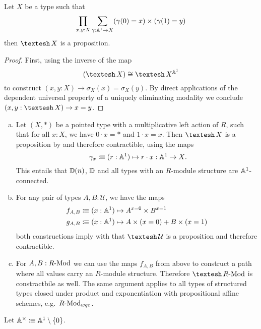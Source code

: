 \begin{lemma}
  \label{A1-paths-to-A1-prop}
  Let $X$ be a type such that
  \[
  \prod_{x,y:X} \sum_{\gamma:\mathbb{A}^1\to X} (\gamma(0)=x)\times (\gamma(1)=y)
  \]
  then $\shape X$ is a proposition.
\end{lemma}

\begin{proof}
  First, using the inverse of the map
  \[
    (\shape X) \cong  \shape X^{\A^1}
  \]
  to construct $(x,y:X)\to \sigma_X(x)=\sigma_X(y)$.
  By direct applications of the dependent universal property of a uniquely eliminating modality we conclude
  $(x,y:\shape X)\to x=y$.
\end{proof}

\begin{example}
  \label{basic-A1-connected-types}
  \begin{enumerate}[(a)]
  \item Let $(X,*)$ be a pointed type with a multiplicative left action of $R$,
    such that for all $x:X$, we have $0\cdot x=*$ and $1\cdot x=x$.
    Then $\shape X$ is a proposition by  and therefore contractible,
    using the maps
    \[
    \gamma_x\colonequiv (r:\A^1)\mapsto r\cdot x : \A^1\to X
    \rlap{.}
    \]
    This entails that $\mathbb{D}(n)$, $\mathbb{D}$ and all types with an $R$-module structure are $\mathbb{A}^1$-connected.
  \item For any pair of types $A,B:\mathcal U$, we have the maps
    \begin{align*}
      f_{A,B}&\vcentcolon\mspace{-1.2mu}\equiv (x:\mathbb{A}^1)\mapsto A^{x=0}\times B^{x=1} \\
      g_{A,B}&\vcentcolon\mspace{-1.2mu}\equiv (x:\mathbb{A}^1)\mapsto A\times (x=0) + B\times(x=1)
    \end{align*}
    both constructions imply with 
    that $\shape \mathcal U$ is a proposition and therefore contractible.
  \item For $A,B:R\text{-}\mathrm{Mod}$ we can use the maps $f_{A,B}$ from above to construct a path
    where all values carry an $R$-module structure.
    Therefore $\shape \Mod{R}$ is constractbile as well.
    The same argument applies to all types of structured types closed under product
    and exponentiation with propositional affine schemes, e.g.\ $R\text{-}\mathrm{Mod}_{wqc}$.
  \end{enumerate}
\end{example}

\begin{definition}
  Let $\mathbb{A}^\times\vcentcolon\mspace{-1.2mu}\equiv \mathbb{A}^1\setminus\{0\}$.
\end{definition}

